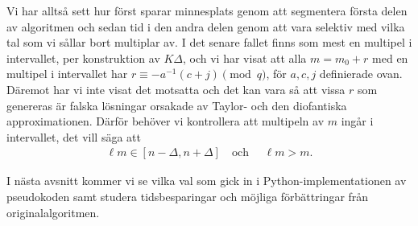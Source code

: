 Vi har alltså sett hur \cite{HaraldSieve} först sparar minnesplats genom att segmentera första delen av algoritmen och sedan tid i den andra delen genom att vara selektiv med vilka tal som vi sållar bort multiplar av. I det senare fallet finns som mest en multipel i intervallet, per konstruktion av \(K \Delta\), och vi har visat att alla \(m = m_0 + r\) med en multipel i intervallet har \(r \equiv - a^{-1} (c + j) \pmod{q}\), för \(a, c, j\) definierade ovan. Däremot har vi inte visat det motsatta och det kan vara så att vissa \(r\) som genereras är falska lösningar orsakade av Taylor- och den diofantiska approximationen. Därför behöver vi kontrollera att multipeln av \(m\) ingår i intervallet, det vill säga att
\begin{align} \label{alg.control}
    \ell m %
    \in [n - \Delta, n + \Delta] \quad \text{och } \quad  \ell m > m.
\end{align}

I nästa avsnitt kommer vi se vilka val som gick in i Python-implementationen av pseudokoden samt studera tidsbesparingar och möjliga förbättringar från originalalgoritmen.

